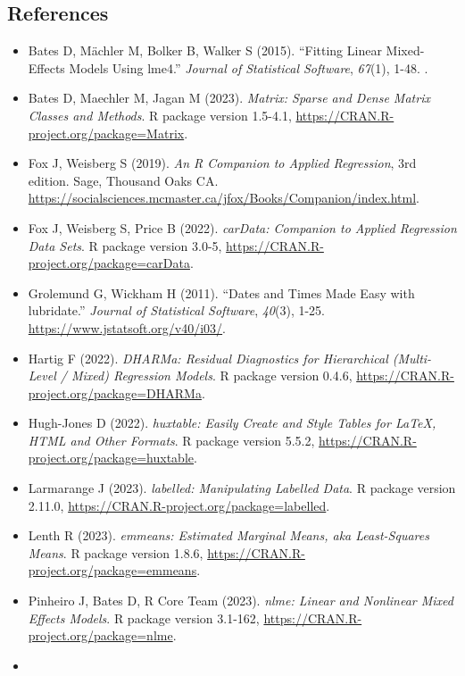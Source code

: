 \documentclass[
]{article}
\providecommand{\tightlist}{%
  \setlength{\itemsep}{0pt}\setlength{\parskip}{0pt}}
\begin{document}
\hypertarget{references}{%
\subsection{References}\label{references}}

\begin{itemize}
\tightlist
\item
  Bates D, Mächler M, Bolker B, Walker S (2015). ``Fitting Linear
  Mixed-Effects Models Using lme4.'' \emph{Journal of Statistical
  Software}, \emph{67}(1), 1-48. .
\item
  Bates D, Maechler M, Jagan M (2023). \emph{Matrix: Sparse and Dense
  Matrix Classes and Methods}. R package version 1.5-4.1,
  \url{https://CRAN.R-project.org/package=Matrix}.
\item
  Fox J, Weisberg S (2019). \emph{An R Companion to Applied Regression},
  3rd edition. Sage, Thousand Oaks CA.
  \url{https://socialsciences.mcmaster.ca/jfox/Books/Companion/index.html}.
\item
  Fox J, Weisberg S, Price B (2022). \emph{carData: Companion to Applied
  Regression Data Sets}. R package version 3.0-5,
  \url{https://CRAN.R-project.org/package=carData}.
\item
  Grolemund G, Wickham H (2011). ``Dates and Times Made Easy with
  lubridate.'' \emph{Journal of Statistical Software}, \emph{40}(3),
  1-25. \url{https://www.jstatsoft.org/v40/i03/}.
\item
  Hartig F (2022). \emph{DHARMa: Residual Diagnostics for Hierarchical
  (Multi-Level / Mixed) Regression Models}. R package version 0.4.6,
  \url{https://CRAN.R-project.org/package=DHARMa}.
\item
  Hugh-Jones D (2022). \emph{huxtable: Easily Create and Style Tables
  for LaTeX, HTML and Other Formats}. R package version 5.5.2,
  \url{https://CRAN.R-project.org/package=huxtable}.
\item
  Larmarange J (2023). \emph{labelled: Manipulating Labelled Data}. R
  package version 2.11.0,
  \url{https://CRAN.R-project.org/package=labelled}.
\item
  Lenth R (2023). \emph{emmeans: Estimated Marginal Means, aka
  Least-Squares Means}. R package version 1.8.6,
  \url{https://CRAN.R-project.org/package=emmeans}.
\item
  Pinheiro J, Bates D, R Core Team (2023). \emph{nlme: Linear and
  Nonlinear Mixed Effects Models}. R package version 3.1-162,
  \url{https://CRAN.R-project.org/package=nlme}.
\item

\end{itemize}
\end{document}
